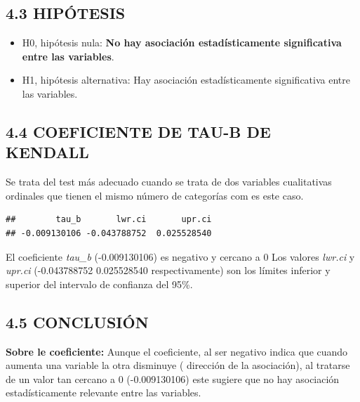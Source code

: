 \documentclass[
  12 pt,
  a4paper,
]{article}
\newenvironment{Shaded}{\begin{snugshade}}{\end{snugshade}}
\newcommand{\AttributeTok}[1]{\textcolor[rgb]{0.13,0.29,0.53}{#1}}
\newcommand{\FloatTok}[1]{\textcolor[rgb]{0.00,0.00,0.81}{#1}}
\newcommand{\FunctionTok}[1]{\textcolor[rgb]{0.13,0.29,0.53}{\textbf{#1}}}
\newcommand{\NormalTok}[1]{#1}
\newcommand{\OtherTok}[1]{\textcolor[rgb]{0.56,0.35,0.01}{#1}}
\newcommand{\SpecialCharTok}[1]{\textcolor[rgb]{0.81,0.36,0.00}{\textbf{#1}}}
\providecommand{\tightlist}{%
  \setlength{\itemsep}{0pt}\setlength{\parskip}{0pt}}
\begin{document}
\subsection{4.3 HIPÓTESIS}\label{hipuxf3tesis-2}

\begin{itemize}
\tightlist
\item
  H0, hipótesis nula: \textbf{No hay asociación estadísticamente
  significativa entre las variables}.
\item
  H1, hipótesis alternativa: Hay asociación estadísticamente
  significativa entre las variables.
\end{itemize}

\subsection{4.4 COEFICIENTE DE TAU-B DE
KENDALL}\label{coeficiente-de-tau-b-de-kendall}

Se trata del test más adecuado cuando se trata de dos variables
cualitativas ordinales que tienen el mismo número de categorías com es
este caso.

\begin{Shaded}
\end{Shaded}

\begin{verbatim}
##        tau_b       lwr.ci       upr.ci 
## -0.009130106 -0.043788752  0.025528540
\end{verbatim}

El coeficiente \emph{tau\_b} (-0.009130106) es negativo y cercano a 0
Los valores \emph{lwr.ci} y \emph{upr.ci} (-0.043788752 0.025528540
respectivamente) son los límites inferior y superior del intervalo de
confianza del 95\%.

\subsection{4.5 CONCLUSIÓN}\label{conclusiuxf3n-2}

\textbf{Sobre le coeficiente:} Aunque el coeficiente, al ser negativo
indica que cuando aumenta una variable la otra disminuye ( dirección de
la asociación), al tratarse de un valor tan cercano a 0 (-0.009130106)
este sugiere que no hay asociación estadísticamente relevante entre las
variables.
\end{document}
